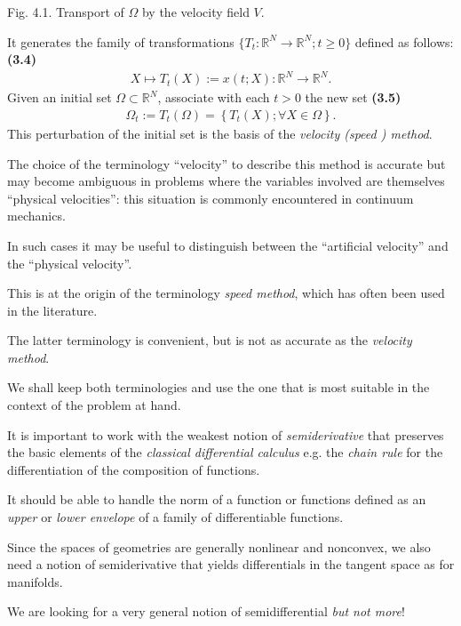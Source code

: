 \documentclass{book}
\numberwithin{equation}{section}
\begin{document}
\begin{enumerate}
    \textsf{Fig. 4.1. Transport of $\Omega$ by the velocity field $V$.}
    
    It generates the family of transformations $\{T_t:\mathbb{R}^N\to\mathbb{R}^N;t\ge 0\}$ defined as follows: \textbf{(3.4)}
    \begin{align*}
        X\mapsto T_t(X) := x(t;X):\mathbb{R}^N\to\mathbb{R}^N.
    \end{align*}
    Given an initial set $\Omega\subset\mathbb{R}^N$, associate with each $t > 0$ the new set \textbf{(3.5)}
    \begin{align*}
        \Omega_t := T_t(\Omega) = \left\{T_t(X);\forall X\in\Omega\right\}.
    \end{align*}
    This perturbation of the initial set is the basis of the \textit{velocity (speed ) method}.
    
    The choice of the terminology ``velocity'' to describe this method is accurate but may become ambiguous in problems where the variables involved are themselves ``physical velocities'': this situation is commonly encountered in continuum mechanics.
    
    In such cases it may be useful to distinguish between the ``artificial velocity'' and the ``physical velocity''.
    
    This is at the origin of the terminology \textit{speed method}, which has often been used in the literature.
    
    The latter terminology is convenient, but is not as accurate as the \textit{velocity method}.
    
    We shall keep both terminologies and use the one that is most suitable in the context of the problem at hand.
    
    It is important to work with the weakest notion of \textit{semiderivative} that preserves the basic elements of the \textit{classical differential calculus} e.g. the \textit{chain rule} for the differentiation of the composition of functions.
    
    It should be able to handle the norm of a function or functions defined as an \textit{upper} or \textit{lower envelope} of a family of differentiable functions.
    
    Since the spaces of geometries are generally nonlinear and nonconvex, we also need a notion of semiderivative that yields differentials in the tangent space as for manifolds.
    
    We are looking for a very general notion of semidifferential \textit{but not more}!
    

\end{enumerate}
\end{document}
